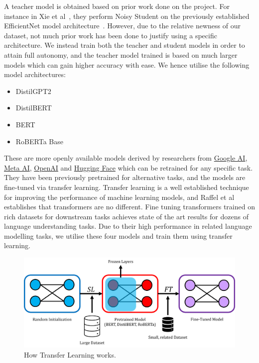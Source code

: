 \documentclass[12pt]{article}
\begin{document}
{A teacher model is obtained based on prior work done on the project. For instance in Xie et al~\cite{noisystudent}, they perform Noisy Student on the previously established EfficientNet model architecture~\cite{efficientnet}. However, due to the relative newness of our dataset, not much prior work has been done to justify using a specific architecture. We instead train both the teacher and student models in order to attain full autonomy, and the teacher model trained is based on much larger models which can gain higher accuracy with ease. We hence utilise the following model architectures:
\begin{multicols}{3}
   \noindent
\begin{itemize}
\item DistilGPT2\cite{distilgpt2}
\item DistilBERT\cite{distilbert}
\end{itemize}
\columnbreak
\begin{itemize}
\item BERT\cite{bert}
\item RoBERTa Base\cite{roberta}
\end{itemize}
\end{multicols}

These are more openly available models derived by researchers from \href{https://ai.google/}{Google AI}, \href{https://ai.facebook.com/}{Meta AI}, \href{https://openai.com/}{OpenAI} and \href{https://huggingface.co/}{Hugging Face} which can be retrained for any specific task. They have been previously pretrained for alternative tasks, and the models are fine-tuned via transfer learning. Transfer learning is a well established technique for improving the performance of machine learning models, and Raffel et al\cite{transferlearningtext} establishes that transformers are no different. Fine tuning transformers trained on rich datasets for downstream tasks achieves state of the art results for dozens of language understanding tasks. Due to their high performance in related language modelling tasks, we utilise these four models and train them using transfer learning.

\begin{figure}[!h]
    \begin{center}
        \includegraphics[scale=0.5]{images/transfer_learning.png}
        \caption{How Transfer Learning works.}
        \label{fig:transferlearning}
    \end{center}
\end{figure}

}
\end{document}
